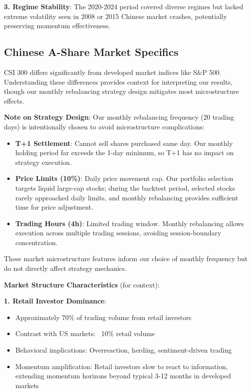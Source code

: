 \textbf{3. Regime Stability}: The 2020-2024 period covered diverse regimes but lacked extreme volatility seen in 2008 or 2015 Chinese market crashes, potentially preserving momentum effectiveness.

\subsection{Chinese A-Share Market Specifics}

CSI 300 differs significantly from developed market indices like S\&P 500. Understanding these differences provides context for interpreting our results, though our monthly rebalancing strategy design mitigates most microstructure effects.

\textbf{Note on Strategy Design}: Our monthly rebalancing frequency (20 trading days) is intentionally chosen to avoid microstructure complications:
\begin{itemize}
    \item \textbf{T+1 Settlement}: Cannot sell shares purchased same day. Our monthly holding period far exceeds the 1-day minimum, so T+1 has no impact on strategy execution.
    \item \textbf{Price Limits (10\%)}: Daily price movement cap. Our portfolio selection targets liquid large-cap stocks; during the backtest period, selected stocks rarely approached daily limits, and monthly rebalancing provides sufficient time for price adjustment.
    \item \textbf{Trading Hours (4h)}: Limited trading window. Monthly rebalancing allows execution across multiple trading sessions, avoiding session-boundary concentration.
\end{itemize}

These market microstructure features inform our choice of monthly frequency but do not directly affect strategy mechanics.

\textbf{Market Structure Characteristics} (for context):

\textbf{1. Retail Investor Dominance}:
\begin{itemize}
    \item Approximately 70\% of trading volume from retail investors
    \item Contrast with US markets: ~10\% retail volume
    \item Behavioral implications: Overreaction, herding, sentiment-driven trading
    \item Momentum amplification: Retail investors slow to react to information, extending momentum horizons beyond typical 3-12 months in developed markets
\end{itemize}

